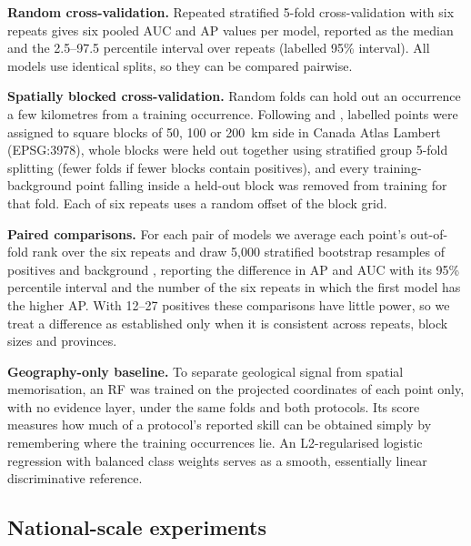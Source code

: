 \documentclass[pdflatex,sn-apa]{sn-jnl}
\begin{document}
\textbf{Random cross-validation.} Repeated stratified 5-fold cross-validation with six repeats gives six pooled AUC and AP values per model, reported as the median and the 2.5--97.5 percentile interval over repeats (labelled 95\% interval). All models use identical splits, so they can be compared pairwise.

\textbf{Spatially blocked cross-validation.} Random folds can hold out an occurrence a few kilometres from a training occurrence. Following \citet{Roberts2017} and \citet{Valavi2019}, labelled points were assigned to square blocks of 50, 100 or 200~km side in Canada Atlas Lambert (EPSG:3978), whole blocks were held out together using stratified group 5-fold splitting (fewer folds if fewer blocks contain positives), and every training-background point falling inside a held-out block was removed from training for that fold. Each of six repeats uses a random offset of the block grid.

\textbf{Paired comparisons.} For each pair of models we average each point's out-of-fold rank over the six repeats and draw 5,000 stratified bootstrap resamples of positives and background \citep{Efron1993}, reporting the difference in AP and AUC with its 95\% percentile interval and the number of the six repeats in which the first model has the higher AP. With 12--27 positives these comparisons have little power, so we treat a difference as established only when it is consistent across repeats, block sizes and provinces.

\textbf{Geography-only baseline.} To separate geological signal from spatial memorisation, an RF was trained on the projected coordinates of each point only, with no evidence layer, under the same folds and both protocols. Its score measures how much of a protocol's reported skill can be obtained simply by remembering where the training occurrences lie. An L2-regularised logistic regression with balanced class weights serves as a smooth, essentially linear discriminative reference.

\subsection{National-scale experiments}\label{sec:national-methods}
\end{document}
